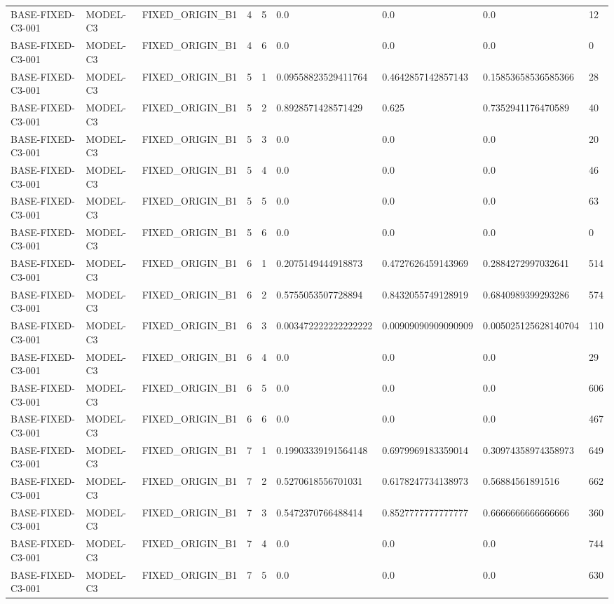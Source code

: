 \begin{tabular}{lllllllll}
BASE-FIXED-C3-001 & MODEL-C3 & FIXED\_ORIGIN\_B1 & 4 & 5 & 0.0 & 0.0 & 0.0 & 12 \\
BASE-FIXED-C3-001 & MODEL-C3 & FIXED\_ORIGIN\_B1 & 4 & 6 & 0.0 & 0.0 & 0.0 & 0 \\
BASE-FIXED-C3-001 & MODEL-C3 & FIXED\_ORIGIN\_B1 & 5 & 1 & 0.09558823529411764 & 0.4642857142857143 & 0.15853658536585366 & 28 \\
BASE-FIXED-C3-001 & MODEL-C3 & FIXED\_ORIGIN\_B1 & 5 & 2 & 0.8928571428571429 & 0.625 & 0.7352941176470589 & 40 \\
BASE-FIXED-C3-001 & MODEL-C3 & FIXED\_ORIGIN\_B1 & 5 & 3 & 0.0 & 0.0 & 0.0 & 20 \\
BASE-FIXED-C3-001 & MODEL-C3 & FIXED\_ORIGIN\_B1 & 5 & 4 & 0.0 & 0.0 & 0.0 & 46 \\
BASE-FIXED-C3-001 & MODEL-C3 & FIXED\_ORIGIN\_B1 & 5 & 5 & 0.0 & 0.0 & 0.0 & 63 \\
BASE-FIXED-C3-001 & MODEL-C3 & FIXED\_ORIGIN\_B1 & 5 & 6 & 0.0 & 0.0 & 0.0 & 0 \\
BASE-FIXED-C3-001 & MODEL-C3 & FIXED\_ORIGIN\_B1 & 6 & 1 & 0.2075149444918873 & 0.4727626459143969 & 0.2884272997032641 & 514 \\
BASE-FIXED-C3-001 & MODEL-C3 & FIXED\_ORIGIN\_B1 & 6 & 2 & 0.5755053507728894 & 0.8432055749128919 & 0.6840989399293286 & 574 \\
BASE-FIXED-C3-001 & MODEL-C3 & FIXED\_ORIGIN\_B1 & 6 & 3 & 0.003472222222222222 & 0.00909090909090909 & 0.005025125628140704 & 110 \\
BASE-FIXED-C3-001 & MODEL-C3 & FIXED\_ORIGIN\_B1 & 6 & 4 & 0.0 & 0.0 & 0.0 & 29 \\
BASE-FIXED-C3-001 & MODEL-C3 & FIXED\_ORIGIN\_B1 & 6 & 5 & 0.0 & 0.0 & 0.0 & 606 \\
BASE-FIXED-C3-001 & MODEL-C3 & FIXED\_ORIGIN\_B1 & 6 & 6 & 0.0 & 0.0 & 0.0 & 467 \\
BASE-FIXED-C3-001 & MODEL-C3 & FIXED\_ORIGIN\_B1 & 7 & 1 & 0.19903339191564148 & 0.6979969183359014 & 0.30974358974358973 & 649 \\
BASE-FIXED-C3-001 & MODEL-C3 & FIXED\_ORIGIN\_B1 & 7 & 2 & 0.5270618556701031 & 0.6178247734138973 & 0.56884561891516 & 662 \\
BASE-FIXED-C3-001 & MODEL-C3 & FIXED\_ORIGIN\_B1 & 7 & 3 & 0.5472370766488414 & 0.8527777777777777 & 0.6666666666666666 & 360 \\
BASE-FIXED-C3-001 & MODEL-C3 & FIXED\_ORIGIN\_B1 & 7 & 4 & 0.0 & 0.0 & 0.0 & 744 \\
BASE-FIXED-C3-001 & MODEL-C3 & FIXED\_ORIGIN\_B1 & 7 & 5 & 0.0 & 0.0 & 0.0 & 630 \\

\end{tabular}

